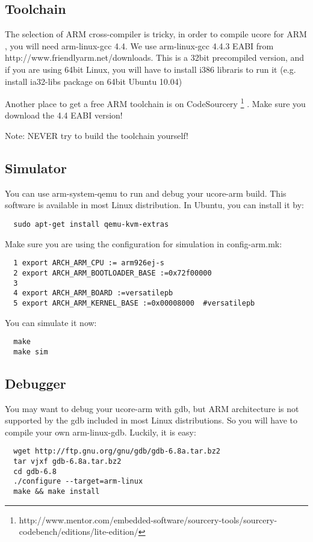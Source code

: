 \documentclass[a4paper]{article}
\begin{document}
\subsection{Toolchain}
The selection of ARM cross-compiler is tricky, in order to compile ucore for ARM
, you will need arm-linux-gcc 4.4. We use arm-linux-gcc 4.4.3 EABI from 
http://www.friendlyarm.net/downloads. This is a 32bit precompiled version,
and if you are using 64bit Linux, you will have to install i386 libraris to run
it (e.g. install ia32-libs package on 64bit Ubuntu 10.04)

Another place to get a free ARM toolchain is on CodeSourcery
\footnote{http://www.mentor.com/embedded-software/sourcery-tools/sourcery-codebench/editions/lite-edition/}
.
Make sure you download the 4.4 EABI version!

Note: NEVER try to build the toolchain yourself!

\subsection{Simulator}
You can use arm-system-qemu to run and debug your ucore-arm build. This software is
available in most Linux distribution. In Ubuntu, you can install it by:
\begin{verbatim}
  sudo apt-get install qemu-kvm-extras
\end{verbatim}

Make sure you are using the configuration for simulation in config-arm.mk:
\begin{verbatim}
  1 export ARCH_ARM_CPU := arm926ej-s
  2 export ARCH_ARM_BOOTLOADER_BASE :=0x72f00000
  3 
  4 export ARCH_ARM_BOARD :=versatilepb
  5 export ARCH_ARM_KERNEL_BASE :=0x00008000  #versatilepb
\end{verbatim}

You can simulate it now:
\begin{verbatim}
  make 
  make sim
\end{verbatim}

\subsection{Debugger}
You may want to debug your ucore-arm with gdb, but 
ARM architecture is not supported by the gdb
included in most Linux distributions. So you will
have to compile your own arm-linux-gdb. Luckily,
it is easy:
\begin{verbatim}
  wget http://ftp.gnu.org/gnu/gdb/gdb-6.8a.tar.bz2
  tar vjxf gdb-6.8a.tar.bz2
  cd gdb-6.8
  ./configure --target=arm-linux
  make && make install
\end{verbatim}
\end{document}
